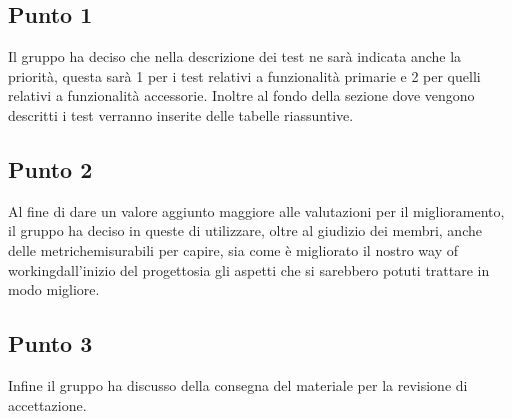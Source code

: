     \subsection{Punto 1} 
    Il gruppo ha deciso che nella descrizione dei test ne sarà indicata anche la priorità, questa sarà 1 per i test relativi a funzionalità primarie e 2 per quelli relativi a funzionalità accessorie.
    Inoltre al fondo della sezione dove vengono descritti i test verranno inserite delle tabelle riassuntive.
    \subsection{Punto 2}
    Al fine di dare un valore aggiunto maggiore alle valutazioni per il miglioramento, il gruppo ha deciso in queste di utilizzare, oltre al giudizio dei membri, anche delle metriche\glosp misurabili per capire, sia come è migliorato il nostro way of working\glosp dall'inizio del progetto\glosp sia gli aspetti che si sarebbero potuti trattare in modo migliore.
    \subsection{Punto 3}
    Infine il gruppo ha discusso della consegna del materiale per la revisione di accettazione.

